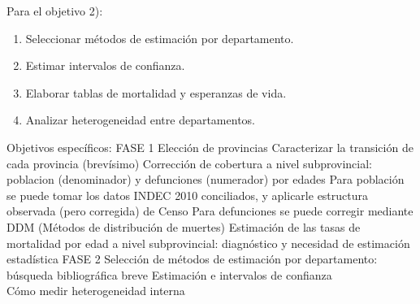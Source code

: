 \documentclass[12pt,spanish,]{article}
\providecommand{\tightlist}{%
  \setlength{\itemsep}{0pt}\setlength{\parskip}{0pt}}
\begin{document}
Para el objetivo 2):

\begin{enumerate}
\def\labelenumi{\alph{enumi}.}
\setcounter{enumi}{3}
\tightlist
\item
  Seleccionar métodos de estimación por departamento.
\item
  Estimar intervalos de confianza.
\item
  Elaborar tablas de mortalidad y esperanzas de vida.
\item
  Analizar heterogeneidad entre departamentos.
\end{enumerate}

Objetivos específicos: FASE 1 Elección de provincias Caracterizar la
transición de cada provincia (brevísimo) Corrección de cobertura a nivel
subprovincial: poblacion (denominador) y defunciones (numerador) por
edades Para población se puede tomar los datos INDEC 2010 conciliados, y
aplicarle estructura observada (pero corregida) de Censo Para
defunciones se puede corregir mediante DDM (Métodos de distribución de
muertes) Estimación de las tasas de mortalidad por edad a nivel
subprovincial: diagnóstico y necesidad de estimación estadística FASE 2
Selección de métodos de estimación por departamento: búsqueda
bibliográfica breve Estimación e intervalos de confianza\\
Cómo medir heterogeneidad interna
\end{document}
